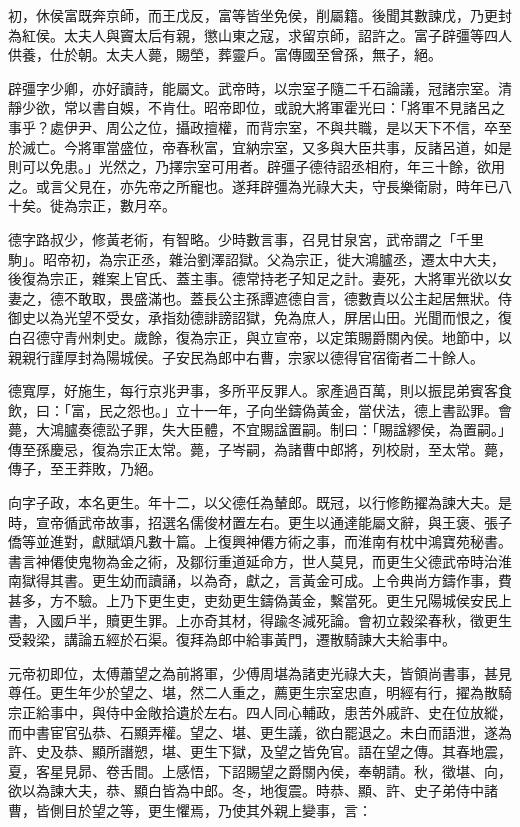 \begin{pinyinscope}
初，休侯富既奔京師，而王戊反，富等皆坐免侯，削屬籍。後聞其數諫戊，乃更封為紅侯。太夫人與竇太后有親，懲山東之寇，求留京師，詔許之。富子辟彊等四人供養，仕於朝。太夫人薨，賜塋，葬靈戶。富傳國至曾孫，無子，絕。

辟彊字少卿，亦好讀詩，能屬文。武帝時，以宗室子隨二千石論議，冠諸宗室。清靜少欲，常以書自娛，不肯仕。昭帝即位，或說大將軍霍光曰：「將軍不見諸呂之事乎？處伊尹、周公之位，攝政擅權，而背宗室，不與共職，是以天下不信，卒至於滅亡。今將軍當盛位，帝春秋富，宜納宗室，又多與大臣共事，反諸呂道，如是則可以免患。」光然之，乃擇宗室可用者。辟彊子德待詔丞相府，年三十餘，欲用之。或言父見在，亦先帝之所寵也。遂拜辟彊為光祿大夫，守長樂衛尉，時年已八十矣。徙為宗正，數月卒。

德字路叔少，修黃老術，有智略。少時數言事，召見甘泉宮，武帝謂之「千里駒」。昭帝初，為宗正丞，雜治劉澤詔獄。父為宗正，徙大鴻臚丞，遷太中大夫，後復為宗正，雜案上官氏、蓋主事。德常持老子知足之計。妻死，大將軍光欲以女妻之，德不敢取，畏盛滿也。蓋長公主孫譚遮德自言，德數責以公主起居無狀。侍御史以為光望不受女，承指劾德誹謗詔獄，免為庶人，屏居山田。光聞而恨之，復白召德守青州刺史。歲餘，復為宗正，與立宣帝，以定策賜爵關內侯。地節中，以親親行謹厚封為陽城侯。子安民為郎中右曹，宗家以德得官宿衛者二十餘人。

德寬厚，好施生，每行京兆尹事，多所平反罪人。家產過百萬，則以振昆弟賓客食飲，曰：「富，民之怨也。」立十一年，子向坐鑄偽黃金，當伏法，德上書訟罪。會薨，大鴻臚奏德訟子罪，失大臣體，不宜賜諡置嗣。制曰：「賜諡繆侯，為置嗣。」傳至孫慶忌，復為宗正太常。薨，子岑嗣，為諸曹中郎將，列校尉，至太常。薨，傳子，至王莽敗，乃絕。

向字子政，本名更生。年十二，以父德任為輦郎。既冠，以行修飭擢為諫大夫。是時，宣帝循武帝故事，招選名儒俊材置左右。更生以通達能屬文辭，與王褒、張子僑等並進對，獻賦頌凡數十篇。上復興神僊方術之事，而淮南有枕中鴻寶苑秘書。書言神僊使鬼物為金之術，及鄒衍重道延命方，世人莫見，而更生父德武帝時治淮南獄得其書。更生幼而讀誦，以為奇，獻之，言黃金可成。上令典尚方鑄作事，費甚多，方不驗。上乃下更生吏，吏劾更生鑄偽黃金，繫當死。更生兄陽城侯安民上書，入國戶半，贖更生罪。上亦奇其材，得踰冬減死論。會初立穀梁春秋，徵更生受穀梁，講論五經於石渠。復拜為郎中給事黃門，遷散騎諫大夫給事中。

元帝初即位，太傅蕭望之為前將軍，少傅周堪為諸吏光祿大夫，皆領尚書事，甚見尊任。更生年少於望之、堪，然二人重之，薦更生宗室忠直，明經有行，擢為散騎宗正給事中，與侍中金敞拾遺於左右。四人同心輔政，患苦外戚許、史在位放縱，而中書宦官弘恭、石顯弄權。望之、堪、更生議，欲白罷退之。未白而語泄，遂為許、史及恭、顯所譖愬，堪、更生下獄，及望之皆免官。語在望之傳。其春地震，夏，客星見昴、卷舌間。上感悟，下詔賜望之爵關內侯，奉朝請。秋，徵堪、向，欲以為諫大夫，恭、顯白皆為中郎。冬，地復震。時恭、顯、許、史子弟侍中諸曹，皆側目於望之等，更生懼焉，乃使其外親上變事，言：


\end{pinyinscope}
